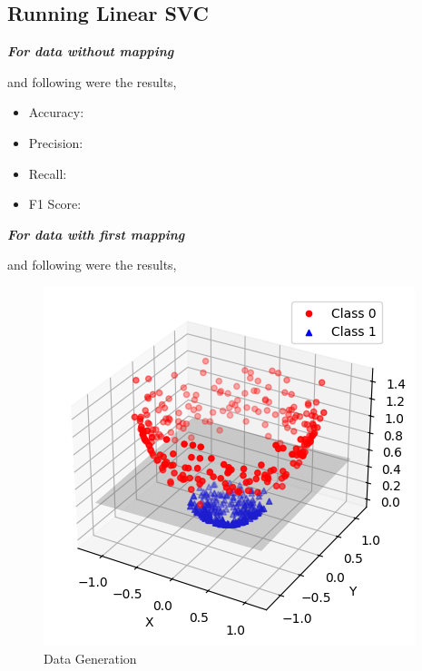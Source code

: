 \documentclass[11pt,a4paper]{article}
\begin{document}
\newpage

\subsection{Running Linear SVC}

\textbf{\textit{For data without mapping}}\\

\lstset{style=mystyle}


and following were the results,

\begin{itemize}
    \item Accuracy: 
    \item Precision:  
    \item Recall: 
    \item F1 Score: 
\end{itemize}


\textbf{\textit{For data with first mapping}}\\

\lstset{style=mystyle}


and following were the results,

{\begin{figure}[h]
    \centering
    \includegraphics[width=1.0\linewidth]{images/4.png}
    \caption{Data Generation}
\end{figure}}
\end{document}
